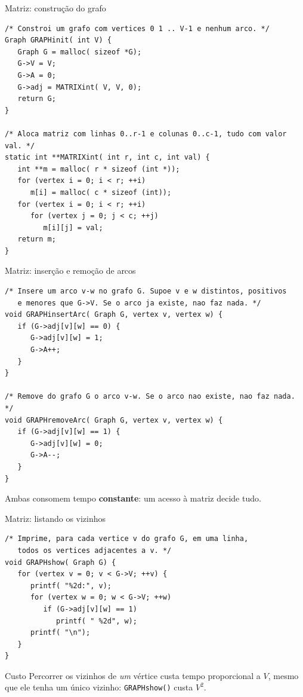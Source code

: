 \documentclass[aspectratio=169]{beamer}
\begin{document}
\begin{frame}[fragile]{Matriz: construção do grafo}
\begin{lstlisting}[basicstyle=\ttfamily\tiny]
/* Constroi um grafo com vertices 0 1 .. V-1 e nenhum arco. */
Graph GRAPHinit( int V) {
   Graph G = malloc( sizeof *G);
   G->V = V;
   G->A = 0;
   G->adj = MATRIXint( V, V, 0);
   return G;
}

/* Aloca matriz com linhas 0..r-1 e colunas 0..c-1, tudo com valor val. */
static int **MATRIXint( int r, int c, int val) {
   int **m = malloc( r * sizeof (int *));
   for (vertex i = 0; i < r; ++i)
      m[i] = malloc( c * sizeof (int));
   for (vertex i = 0; i < r; ++i)
      for (vertex j = 0; j < c; ++j)
         m[i][j] = val;
   return m;
}
\end{lstlisting}
\end{frame}

\begin{frame}[fragile]{Matriz: inserção e remoção de arcos}
\begin{lstlisting}[basicstyle=\ttfamily\tiny]
/* Insere um arco v-w no grafo G. Supoe v e w distintos, positivos
   e menores que G->V. Se o arco ja existe, nao faz nada. */
void GRAPHinsertArc( Graph G, vertex v, vertex w) {
   if (G->adj[v][w] == 0) {
      G->adj[v][w] = 1;
      G->A++;
   }
}

/* Remove do grafo G o arco v-w. Se o arco nao existe, nao faz nada. */
void GRAPHremoveArc( Graph G, vertex v, vertex w) {
   if (G->adj[v][w] == 1) {
      G->adj[v][w] = 0;
      G->A--;
   }
}
\end{lstlisting}
  {\small Ambas consomem tempo \textbf{constante}: um acesso à matriz decide tudo.}
\end{frame}

\begin{frame}[fragile]{Matriz: listando os vizinhos}
\begin{lstlisting}
/* Imprime, para cada vertice v do grafo G, em uma linha,
   todos os vertices adjacentes a v. */
void GRAPHshow( Graph G) {
   for (vertex v = 0; v < G->V; ++v) {
      printf( "%2d:", v);
      for (vertex w = 0; w < G->V; ++w)
         if (G->adj[v][w] == 1)
            printf( " %2d", w);
      printf( "\n");
   }
}
\end{lstlisting}
  \begin{alertblock}{Custo}
    {\scriptsize Percorrer os vizinhos de \emph{um} vértice custa tempo
    proporcional a $V$, mesmo que ele tenha um único vizinho:
    \texttt{GRAPHshow()} custa $V^2$.}
  \end{alertblock}
\end{frame}
\end{document}
